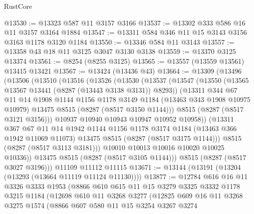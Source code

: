 \begin{lexlean}{RustCore}
\begin{coremodule}
@13530 := @13323 @587 @11 @3157 @3166
@13537 := @13302 @333 @586 @16 @11 @3157 @3164 @1884
@13547 := @13311 @584 @346 @11 @15 @3143 @3156 @3163 @1178 @3120 @1184
@13550 := @13346 @584 @11 @3143
@13557 := @13358 @43 @18 @11 @3125 @3047 @3130 @3138
@13559 := @13370 @3125 @13374
@13561 := @8254 (@8255 @3125)
@13565 := @13557 (@13559 @13561) @13415 @13421
@13567 := @13424 (@13436 @43)
@13664 := @13309
    (@13496
      (@13506
        (@13510
          (@13516
            (@13526
              (@13530
                (@13537
                  (@13547
                    (@13550 (@13565 @13567 @13441 (@8287 (@13443 @3138 @3131)) @8293))
                    (@13311
                      @344
                      @67
                      @11
                      @14
                      @1908
                      @1144
                      @1156
                      @1178
                      @3149
                      @1184
                      (@13463 @343 @1908 @10975 @10979)
                      @13475
                      @8515
                      (@8287 (@8517 @3150 @1144)))
                    @8515
                    (@8287 (@8517 @3121 @3156)))
                  @10937
                  @10940
                  @10943
                  @10947
                  @10952
                  @10958))
              (@13311
                @367
                @67
                @11
                @14
                @1942
                @1144
                @1156
                @1178
                @3174
                @1184
                (@13463 @366 @1942 @11069 @11073)
                @13475
                @8515
                (@8287 (@8517 @3175 @1144)))
              @8515
              (@8287 (@8517 @3113 @3181)))
            @10010
            @10013
            @10016
            @10020
            @10025
            @10336))
        @13475
        @8515
        (@8287 (@8517 @3105 @1144)))
      @8515
      (@8287 (@8517 @3027 @3196)))
    @11109
    @11112
    @11115
@13671 := @13144 (@13191 (@13204 (@13293 (@13664 @11119 @11124 @11130))))
@13877 := @12784
    @616
    @16
    @11
    @3326
    @3333
    @1953
    (@8866
      @610
      @615
      @11
      @15
      @3279
      @3325
      @3332
      @1178
      @3215
      @1184
      (@12698
        @610
        @11
        @3268
        @3277
        (@12825
          @609
          @16
          @11
          @3268
          @3275
          @1574
          (@8866
            @607
            @580
            @11
            @15
            @3254
            @3267
            @3274

\end{coremodule}
\end{lexlean}
